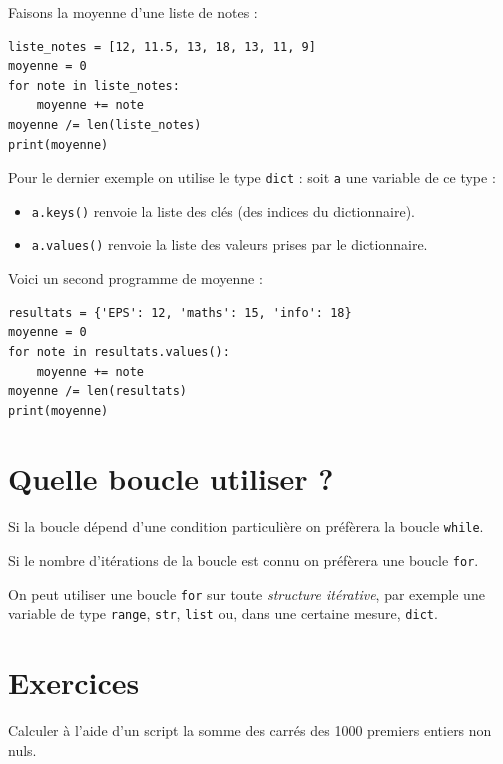 Faisons la moyenne d'une liste de notes :


\begin{pyc}
\begin{verbatim}
liste_notes = [12, 11.5, 13, 18, 13, 11, 9]
moyenne = 0
for note in liste_notes:
    moyenne += note
moyenne /= len(liste_notes)
print(moyenne)
\end{verbatim}
\end{pyc}

Pour le dernier exemple on utilise le type \texttt{dict} : soit \texttt{a} une variable de ce type :
\begin{itemize}
    \item   \texttt{a.keys()} renvoie la liste des clés (des indices du dictionnaire).
    \item   \texttt{a.values()} renvoie la liste des valeurs prises par le dictionnaire.
\end{itemize}

Voici un second programme de moyenne :

\begin{pyc}
\begin{verbatim}
resultats = {'EPS': 12, 'maths': 15, 'info': 18}
moyenne = 0
for note in resultats.values():
    moyenne += note
moyenne /= len(resultats)
print(moyenne)
\end{verbatim}
\end{pyc}

\section{Quelle boucle utiliser ?}

Si la boucle dépend d'une condition particulière on préfèrera la boucle \texttt{while}.

Si le nombre d'itérations de la boucle est connu on préfèrera une boucle \texttt{for}.

On peut utiliser une boucle \texttt{for} sur toute \textit{structure itérative}, par exemple 
    une variable de type \texttt{range}, \texttt{str}, \texttt{list} ou, dans une certaine mesure, \texttt{dict}.
    
\section{Exercices}
\begin{exercice}
    Calculer à l'aide d'un script la somme des carrés des 1000 premiers entiers non nuls.
\end{exercice}

